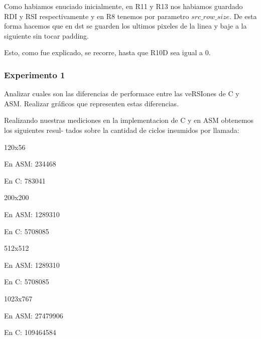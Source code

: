Como habiamos enuciado inicialmente, en R11 y R13 nos habiamos guardado RDI y RSI respectivamente y en R8 tenemos por parametro
$src\_row\_size$. De esta forma hacemos que en dst se guarden los ultimos pixeles de la linea y baje a la siguiente sin tocar padding.\newline

Esto, como fue explicado, se recorre, hasta que R10D sea igual a 0.


\vspace*{0.3cm} \noindent
\subsubsection{Experimento 1}

  Analizar cuales son las diferencias de performace entre las veRSIones de C y ASM. 
  Realizar gráficos que representen estas diferencias.\vspace*{0.3cm} \noindent
  
Realizando nuestras mediciones en la implementacion de C y en ASM obtenemos los siguientes resul-
tados sobre la cantidad de ciclos insumidos por llamada:
  \vspace*{0.3cm} \noindent
  

  
120x56

En ASM: 234468

En C: 783041

\vspace*{0.3cm} \noindent
200x200

En ASM: 1289310

En C: 5708085

\vspace*{0.3cm} \noindent
512x512

En ASM: 1289310

En C: 5708085

\vspace*{0.3cm} \noindent
1023x767

En ASM: 27479906

En C: 109464584


 \vspace*{0.3cm}
 
